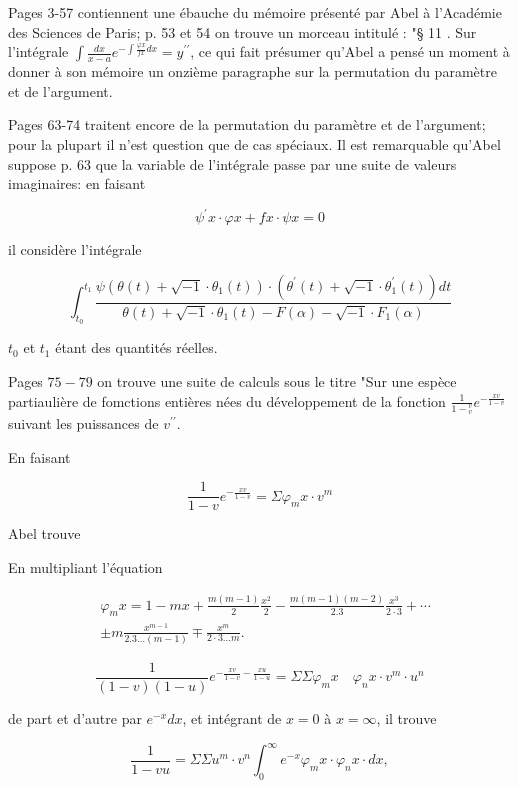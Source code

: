 \documentclass{article}
\begin{document}
Pages 3-57 contiennent une ébauche du mémoire présenté par Abel à l'Académie des Sciences de Paris; p. 53 et 54 on trouve un morceau intitulé : "§ 11 . Sur l'intégrale \(\int \frac{d x}{x-a} e^{-\int \frac{\varphi x}{f x} d x}=y^{\prime \prime}\), ce qui fait présumer qu'Abel a pensé un moment à donner à son mémoire un onzième paragraphe sur la permutation du paramètre et de l'argument.

Pages 63-74 traitent encore de la permutation du paramètre et de l'argument; pour la plupart il n'est question que de cas spéciaux. Il est remarquable qu'Abel suppose p. 63 que la variable de l'intégrale passe par une suite de valeurs imaginaires: en faisant

\[
\psi^{\prime} x \cdot \varphi x+f x \cdot \psi x=0
\]

il considère l'intégrale

\[
\int_{t_{0}}^{t_{1}} \frac{\psi\left(\theta(t)+\sqrt{-1} \cdot \theta_{1}(t)\right) \cdot\left(\theta^{\prime}(t)+\sqrt{-1} \cdot \theta_{1}^{\prime}(t)\right) d t}{\theta(t)+\sqrt{-1} \cdot \theta_{1}(t)-F(\alpha)-\sqrt{-1} \cdot F_{1}(\alpha)}
\]

\(t_{0}\) et \(t_{1}\) étant des quantités réelles.

Pages \(75-79\) on trouve une suite de calculs sous le titre "Sur une espèce partiaulière de fomctions entières nées du développement de la fonction \(\frac{1}{1-{ }_{v}^{v}} e^{-\frac{x v}{1-v}}\) suivant les puissances de \(v^{\prime \prime}\).

En faisant

\[
\frac{1}{1-v} e^{-\frac{x v}{1-v}}=\Sigma \varphi_{m} x \cdot v^{m}
\]

Abel trouve

En multipliant l'équation

\[
\begin{aligned}
& \varphi_{m} x=1-m x+\frac{m(m-1)}{2} \frac{x^{2}}{2}-\frac{m(m-1)(m-2)}{2.3} \frac{x^{3}}{2 \cdot 3}+\cdots \\
& \pm m \frac{x^{m-1}}{2.3 \ldots(m-1)} \mp \frac{x^{m}}{2 \cdot 3 \ldots m} .
\end{aligned}
\]

\[
\frac{1}{(1-v)(1-u)} e^{-\frac{x v}{1-v}-\frac{x u}{1-u}}=\Sigma \Sigma \varphi_{m} x \quad \varphi_{n} x \cdot v^{m} \cdot u^{n}
\]

de part et d'autre par \(e^{-x} d x\), et intégrant de \(x=0\) à \(x=\infty\), il trouve

\[
\frac{1}{1-v u}=\Sigma \Sigma u^{m} \cdot v^{n} \int_{0}^{\infty} e^{-x} \varphi_{m} x \cdot \varphi_{n} x \cdot d x,
\]
\end{document}

